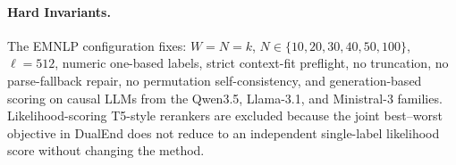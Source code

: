 

\paragraph{Hard Invariants.}
The EMNLP configuration fixes: $W=N=k$, $N\in\{10,20,30,40,50,100\}$, $\ell{=}512$, numeric one-based labels, strict context-fit preflight, no truncation, no parse-fallback repair, no permutation self-consistency, and generation-based scoring on causal LLMs from the Qwen3.5, Llama-3.1, and Ministral-3 families. Likelihood-scoring T5-style rerankers are excluded because the joint best--worst objective in DualEnd does not reduce to an independent single-label likelihood score without changing the method.
